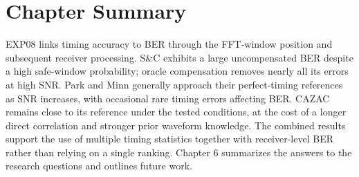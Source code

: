 \section{Chapter Summary}
EXP08 links timing accuracy to BER through the FFT-window position and subsequent receiver processing. S\&C exhibits a large uncompensated BER despite a high safe-window probability; oracle compensation removes nearly all its errors at high SNR. Park and Minn generally approach their perfect-timing references as SNR increases, with occasional rare timing errors affecting BER. CAZAC remains close to its reference under the tested conditions, at the cost of a longer direct correlation and stronger prior waveform knowledge. The combined results support the use of multiple timing statistics together with receiver-level BER rather than relying on a single ranking. Chapter 6 summarizes the answers to the research questions and outlines future work.
